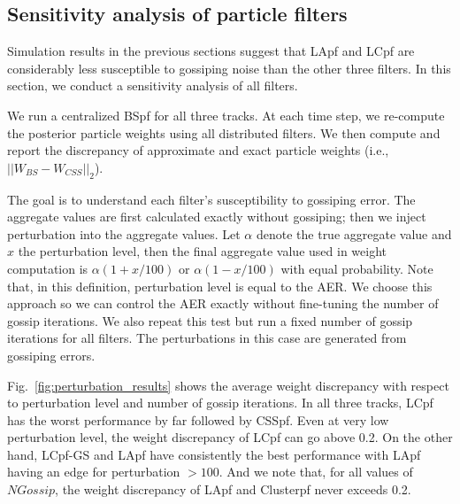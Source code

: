 \documentclass[10pt,letterpaper,final]{article}
\begin{document}
\subsection{Sensitivity analysis of particle filters}
Simulation results in the previous sections suggest that LApf and LCpf are considerably less susceptible to gossiping noise than the other three filters. In this section, we conduct a sensitivity analysis of all filters.

We run a centralized BSpf for all three tracks. At each time step, we re-compute the posterior particle weights using all distributed filters. We then compute and report the discrepancy of approximate and exact particle weights (i.e., $||W_{BS}-W_{CSS}||_2$).

The goal is to understand each filter's susceptibility to gossiping error. The aggregate values are first calculated exactly without gossiping; then we inject perturbation into the aggregate values. Let $\alpha$ denote the true aggregate value and $x$ the perturbation level, then the final aggregate value used in weight computation is $\alpha(1+ x/100)$ or $\alpha(1- x/100)$ with equal probability. Note that, in this definition, perturbation level is equal to the AER. We choose this approach so we can control the AER exactly without fine-tuning the number of gossip iterations. We also repeat this test but run a fixed number of gossip iterations for all filters. The perturbations in this case are generated from gossiping errors. 

Fig.~\ref{fig:perturbation_results} shows the average weight discrepancy with respect to perturbation level and number of gossip iterations. In all three tracks, LCpf has the worst performance by far followed by CSSpf. Even at very low perturbation level, the weight discrepancy of LCpf can go above 0.2. On the other hand, LCpf-GS and LApf have consistently the best performance with LApf having an edge for perturbation $>100$. And we note that, for all values of $NGossip$, the weight discrepancy of LApf and Clusterpf never exceeds 0.2. 
\end{document}
